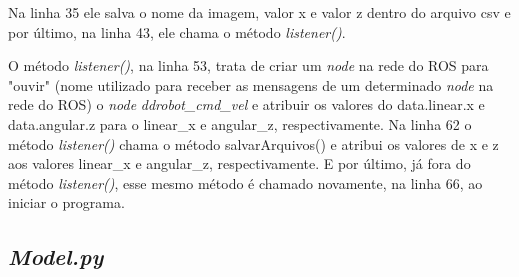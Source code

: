 Na linha 35 ele salva o nome da imagem, valor x e valor z dentro do arquivo csv e por último, na linha 43, ele chama o método \textit{listener()}.

	\begin{figure}[H]
		\centering
\end{figure}

O método \textit{listener()}, na linha 53, trata de criar um \textit{node} na rede do ROS para "ouvir" (nome utilizado para receber as mensagens de um determinado \textit{node} na rede do ROS) o \textit{node} \textit{ddrobot\_cmd\_vel} e atribuir os valores do data.linear.x e data.angular.z para o linear\_x e angular\_z, respectivamente.
Na linha 62 o método \textit{listener()} chama o método salvarArquivos() e atribui os valores de x e z aos valores linear\_x e angular\_z, respectivamente. E por último, já fora do método \textit{listener()}, esse mesmo método é chamado novamente, na linha 66, ao iniciar o programa.

\subsection{\textit{Model.py}}
\label{codigo_model}

	\begin{figure}[H]
		\centering
\end{figure}


